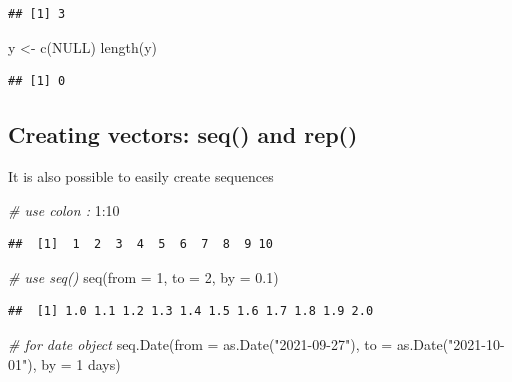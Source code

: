 \documentclass[
  11pt,
]{book}
\newenvironment{Shaded}{\begin{snugshade}}{\end{snugshade}}
\newcommand{\AttributeTok}[1]{\textcolor[rgb]{0.77,0.63,0.00}{#1}}
\newcommand{\CommentTok}[1]{\textcolor[rgb]{0.56,0.35,0.01}{\textit{#1}}}
\newcommand{\ConstantTok}[1]{\textcolor[rgb]{0.00,0.00,0.00}{#1}}
\newcommand{\DecValTok}[1]{\textcolor[rgb]{0.00,0.00,0.81}{#1}}
\newcommand{\FloatTok}[1]{\textcolor[rgb]{0.00,0.00,0.81}{#1}}
\newcommand{\FunctionTok}[1]{\textcolor[rgb]{0.00,0.00,0.00}{#1}}
\newcommand{\NormalTok}[1]{#1}
\newcommand{\OtherTok}[1]{\textcolor[rgb]{0.56,0.35,0.01}{#1}}
\newcommand{\SpecialCharTok}[1]{\textcolor[rgb]{0.00,0.00,0.00}{#1}}
\newcommand{\StringTok}[1]{\textcolor[rgb]{0.31,0.60,0.02}{#1}}
\begin{document}
\begin{verbatim}
## [1] 3
\end{verbatim}

\begin{Shaded}
\begin{Highlighting}[]
\NormalTok{y }\OtherTok{\textless{}{-}} \FunctionTok{c}\NormalTok{(}\ConstantTok{NULL}\NormalTok{)}
\FunctionTok{length}\NormalTok{(y)}
\end{Highlighting}
\end{Shaded}

\begin{verbatim}
## [1] 0
\end{verbatim}

\hypertarget{creating-vectors-seq-and-rep}{%
\subsection{Creating vectors: seq() and rep()}\label{creating-vectors-seq-and-rep}}

It is also possible to easily create sequences

\begin{Shaded}
\begin{Highlighting}[]
\CommentTok{\# use colon \textquotesingle{}:\textquotesingle{}}
\DecValTok{1}\SpecialCharTok{:}\DecValTok{10}
\end{Highlighting}
\end{Shaded}

\begin{verbatim}
##  [1]  1  2  3  4  5  6  7  8  9 10
\end{verbatim}

\begin{Shaded}
\begin{Highlighting}[]
\CommentTok{\# use seq()}
\FunctionTok{seq}\NormalTok{(}\AttributeTok{from =} \DecValTok{1}\NormalTok{, }\AttributeTok{to =} \DecValTok{2}\NormalTok{, }\AttributeTok{by =} \FloatTok{0.1}\NormalTok{)}
\end{Highlighting}
\end{Shaded}

\begin{verbatim}
##  [1] 1.0 1.1 1.2 1.3 1.4 1.5 1.6 1.7 1.8 1.9 2.0
\end{verbatim}

\begin{Shaded}
\begin{Highlighting}[]
\CommentTok{\# for date object}
\FunctionTok{seq.Date}\NormalTok{(}\AttributeTok{from =} \FunctionTok{as.Date}\NormalTok{(}\StringTok{"2021{-}09{-}27"}\NormalTok{), }
         \AttributeTok{to =} \FunctionTok{as.Date}\NormalTok{(}\StringTok{"2021{-}10{-}01"}\NormalTok{), }
         \AttributeTok{by =} \StringTok{\textquotesingle{}1 days\textquotesingle{}}\NormalTok{)}
\end{Highlighting}
\end{Shaded}
\end{document}
